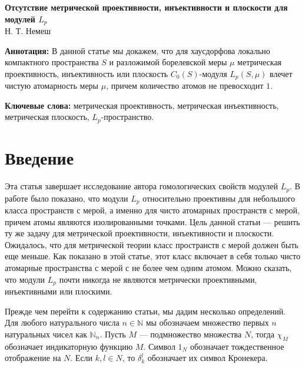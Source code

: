 \documentclass[12pt]{article}
\begin{document}
\begin{center}
    \Large \textbf{Отсутствие метрической проективности, инъективности и 
    плоскости для модулей $L_p$}\\[0.5cm]
    \small {Н. Т. Немеш}\\[0.5cm]
\end{center}

\thispagestyle{empty}

\medskip
\textbf{Аннотация:} В данной статье мы докажем, что для хаусдорфова 
локально компактного пространства $S$ и разложимой борелевской меры $\mu$ 
метрическая проективность, инъективность или 
плоскость $C_0(S)$-модуля $L_p(S,\mu)$ влечет чистую атомарность меры $\mu$, 
причем количество атомов не превосходит $1$.
\medskip

\textbf{Ключевые слова:} метрическая проективность, метрическая инъективность, 
метрическая плоскость, $L_p$-пространство.

\bigskip


\section{Введение}\label{SctnIntro}

Эта статья завершает исследование автора гомологических свойств модулей $L_p$. 
В работе \cite{NemRelProjModLp} было показано, что модули $L_p$ относительно 
проективны для небольшого класса пространств с мерой, а именно для чисто 
атомарных пространств с мерой, причем атомы являются изолированными точками. Цель 
данной статьи --- решить ту же задачу для метрической проективности, 
инъективности и плоскости. Ожидалось, что для метрической теории класс 
пространств с мерой должен быть еще меньше. Как показано в этой статье, этот 
класс включает в себя только чисто атомарные пространства с мерой с не более 
чем одним атомом. Можно сказать, что модули $L_p$ почти 
никогда не являются метрически проективными, инъективными или плоскими.

Прежде чем перейти к содержанию статьи, мы дадим несколько определений. 
Для любого натурального числа $n\in\mathbb{N}$ мы обозначаем множество первых 
$n$ натуральных чисел как $\mathbb{N}_n$. Пусть $M$ --- подмножество множества 
$N$, тогда $\chi_M$ обозначает индикаторную функцию $M$. Символ $1_N$ обозначает 
тождественное отображение на $N$. Если $k,l\in N$, то $\delta_{k}^{l}$ обозначает 
их символ Кронекера.
\end{document}
